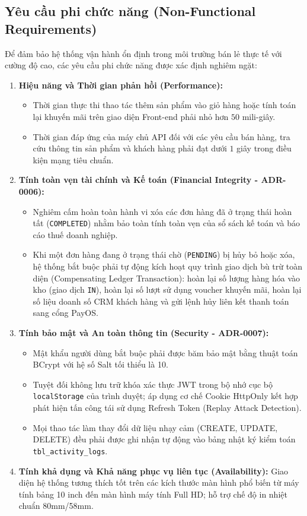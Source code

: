 \subsection{Yêu cầu phi chức năng (Non-Functional Requirements)}
Để đảm bảo hệ thống vận hành ổn định trong môi trường bán lẻ thực tế với cường độ cao, các yêu cầu phi chức năng được xác định nghiêm ngặt:
\begin{enumerate}[label=\arabic*., leftmargin=1.5cm]
    \item \textbf{Hiệu năng và Thời gian phản hồi (Performance):}
    \begin{itemize}
        \item Thời gian thực thi thao tác thêm sản phẩm vào giỏ hàng hoặc tính toán lại khuyến mãi trên giao diện Front-end phải nhỏ hơn $50$ mili-giây.
        \item Thời gian đáp ứng của máy chủ API đối với các yêu cầu bán hàng, tra cứu thông tin sản phẩm và khách hàng phải đạt dưới $1$ giây trong điều kiện mạng tiêu chuẩn.
    \end{itemize}
    \item \textbf{Tính toàn vẹn tài chính và Kế toán (Financial Integrity - ADR-0006):}
    \begin{itemize}
        \item Nghiêm cấm hoàn toàn hành vi xóa các đơn hàng đã ở trạng thái hoàn tất (\texttt{COMPLETED}) nhằm bảo toàn tính toàn vẹn của sổ sách kế toán và báo cáo thuế doanh nghiệp.
        \item Khi một đơn hàng đang ở trạng thái chờ (\texttt{PENDING}) bị hủy bỏ hoặc xóa, hệ thống bắt buộc phải tự động kích hoạt quy trình giao dịch bù trừ toàn diện (Compensating Ledger Transaction): hoàn lại số lượng hàng hóa vào kho (giao dịch \texttt{IN}), hoàn lại số lượt sử dụng voucher khuyến mãi, hoàn lại số liệu doanh số CRM khách hàng và gửi lệnh hủy liên kết thanh toán sang cổng PayOS.
    \end{itemize}
    \item \textbf{Tính bảo mật và An toàn thông tin (Security - ADR-0007):}
    \begin{itemize}
        \item Mật khẩu người dùng bắt buộc phải được băm bảo mật bằng thuật toán BCrypt với hệ số Salt tối thiểu là 10.
        \item Tuyệt đối không lưu trữ khóa xác thực JWT trong bộ nhớ cục bộ \texttt{localStorage} của trình duyệt; áp dụng cơ chế Cookie HttpOnly kết hợp phát hiện tấn công tái sử dụng Refresh Token (Replay Attack Detection).
        \item Mọi thao tác làm thay đổi dữ liệu nhạy cảm (CREATE, UPDATE, DELETE) đều phải được ghi nhận tự động vào bảng nhật ký kiểm toán \texttt{tbl\_activity\_logs}.
    \end{itemize}
    \item \textbf{Tính khả dụng và Khả năng phục vụ liên tục (Availability):} Giao diện hệ thống tương thích tốt trên các kích thước màn hình phổ biến từ máy tính bảng 10 inch đến màn hình máy tính Full HD; hỗ trợ chế độ in nhiệt chuẩn 80mm/58mm.
\end{enumerate}

